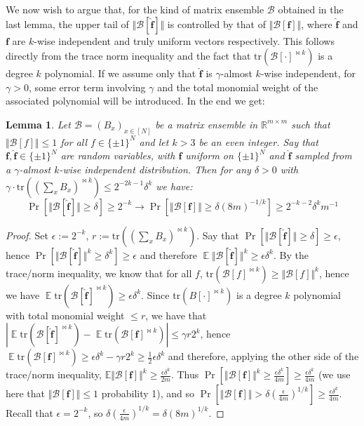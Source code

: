 \documentclass[11pt]{article}
\newtheorem{lemma}{Lemma}
\newcommand{\E}{\mathop{\mathbb{E}}}
\newcommand{\norm}[1]{\Vert #1 \Vert}
\newcommand{\N}{[N]}
\begin{document}
We now wish to argue that, for the kind of matrix ensemble $\mathcal{B}$ obtained in the last lemma, the upper tail of $\norm{\mathcal{B}[\bm{\hat{f}}]}$ is controlled by that of $\norm{\mathcal{B}[\bm{f}]}$, where $\bm{\hat{f}}$ and $\bm{f}$ are $k$-wise independent and truly uniform vectors respectively. This follows directly from the trace norm inequality and the fact that $\mathrm{tr}(\mathcal{B}[\cdot]^{\bowtie k})$ is a degree $k$ polynomial. If we assume only that $\bm{\hat{f}}$ is $\gamma$-almost $k$-wise independent, for $\gamma > 0$, some error term involving $\gamma$ and the total monomial weight of the associated polynomial will be introduced. In the end we get:
\begin{lemma}\label{lem:trace-poly}
Let $\mathcal{B} = (B_x)_{x \in \N}$ be a matrix ensemble in $\mathbb{R}^{m \times m}$ such that $\norm{\mathcal{B}[f]} \leq 1$ for all $f\in \{\pm 1\}^N$ and let $k>3$ be an even integer. Say that $\bm{f}, \bm{\hat{f}}\in \{\pm 1\}^N$ are random variables, with $\bm{f}$ uniform on $\{\pm 1\}^N$ and $\bm{\hat{f}}$ sampled from a $\gamma$-almost $k$-wise independent distribution. Then for any $\delta > 0$ with $\gamma\cdot  \mathrm{tr}((\sum_x B_x)^{\bowtie k}) \leq 2^{-2k - 1} \delta^k$ we have:
\[
\Pr[\norm{\mathcal{B}[\bm{\hat{f}}]} \geq \delta] \geq 2^{-k} \longrightarrow \Pr[\norm{\mathcal{B}[\bm{f}]} \geq \delta (8m)^{-1/k}] \geq 2^{-k-2} \delta^k m^{-1}
\]
\end{lemma}
\begin{proof}
Set $\epsilon:= 2^{-k}$, $r:= \mathrm{tr}((\sum_x B_x)^{\bowtie k})$. Say that $\Pr[\norm{\mathcal{B}[\bm{\hat{f}}]} \geq \delta] \geq \epsilon$, hence  $\Pr[\norm{\mathcal{B}[\bm{\hat{f}}]}^k \geq \delta^k] \geq \epsilon$ and therefore $\E \norm{\mathcal{B}[\bm{\hat{f}}]}^k \geq \epsilon \delta^k$. By the trace/norm inequality, we know that for all $f$, $ \mathrm{tr}(\mathcal{B}[f]^{\bowtie k}) \geq \norm{\mathcal{B}[f]}^k $, hence we have $\E \mathrm{tr}(\mathcal{B}[\bm{\hat{f}}]^{\bowtie k}) \geq \epsilon \delta^k$. Since $\mathrm{tr}(B[\cdot]^{\bowtie k})$ is a degree $k$ polynomial with total monomial weight $\leq r$, we have that $|\E \mathrm{tr}(\mathcal{B}[\bm{\hat{f}}]^{\bowtie k}) - \E \mathrm{tr}(\mathcal{B}[\bm{f}]^{\bowtie k})| \leq \gamma r 2^k$, hence $\E \mathrm{tr}(\mathcal{B}[\bm{f}]^{\bowtie k}) \geq \epsilon \delta^k - \gamma r2^k \geq \frac{1}{2} \epsilon \delta^k$ and therefore, applying the other side of the trace/norm inequality, $\mathbb{E}\norm{\mathcal{B}[\bm{f}]}^k \geq \frac{\epsilon \delta^k}{2m}$. Thus $\Pr[\norm{\mathcal{B}[\bm{f}]}^k \geq   \frac{\epsilon \delta^k}{4m} ] \geq  \frac{\epsilon \delta^k}{4m} $ (we use here that $\norm{\mathcal{B}[\bm{f}]}\leq 1$ probability 1), and so $\Pr[\norm{\mathcal{B}[\bm{f}]} >  \delta (\frac{\epsilon}{4m})^{1/k} ] \geq  \frac{\epsilon \delta^k}{4m}$. Recall that $\epsilon = 2^{-k}$, so $\delta(\frac{\epsilon}{4m})^{1/k} = \delta (8m)^{1/k}$. 
\end{proof}
\end{document}
